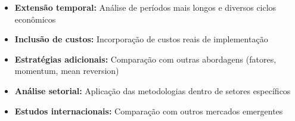 \begin{itemize}
    \item \textbf{Extensão temporal:} Análise de períodos mais longos e diversos ciclos econômicos
    \item \textbf{Inclusão de custos:} Incorporação de custos reais de implementação
    \item \textbf{Estratégias adicionais:} Comparação com outras abordagens (fatores, momentum, mean reversion)
    \item \textbf{Análise setorial:} Aplicação das metodologias dentro de setores específicos
    \item \textbf{Estudos internacionais:} Comparação com outros mercados emergentes
\end{itemize}